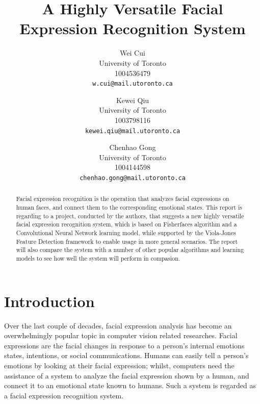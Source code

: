 \documentclass[10pt,twocolumn,letterpaper]{article}
\begin{document}
\title{A Highly Versatile Facial Expression Recognition System}

\author{Wei Cui\\
University of Toronto\\
1004536479\\
{\tt\small w.cui@mail.utoronto.ca}
\and
Kewei Qiu\\
University of Toronto\\
1003798116\\
{\tt\small kewei.qiu@mail.utoronto.ca}
\and
Chenhao Gong\\
University of Toronto\\
1004144598\\
{\tt\small chenhao.gong@mail.utoronto.ca}
}

\maketitle

\begin{abstract}
   Facial expression recognition is the operation that analyzes facial expressions on human faces, and connect them to the corresponding emotional states. This report is regarding to a project, conducted by the authors, that suggests a new highly versatile facial expression recognition system, which is based on Fisherfaces algorithm and a Convolutional Neural Network learning model, while supported by the Viola-Jones Feature Detection framework to enable usage in more general scenarios. The report will also compare the system with a number of other popular algorithms and learning models to see how well the system will perform in compasion. 
\end{abstract}

\section{Introduction}
Over the last couple of decades, facial expression analysis has become an overwhelmingly popular topic in computer vision related researches. Facial expressions are the facial changes in response to a person's internal emotions states, intentions, or social communications. Humans can easily tell a person's emotions by looking at their facial expression; whilst, computers need the assistance of a system to analyze the facial expression shown by a human, and connect it to an emotional state known to humans. Such a system is regarded as a facial expression recognition system. 
\end{document}
